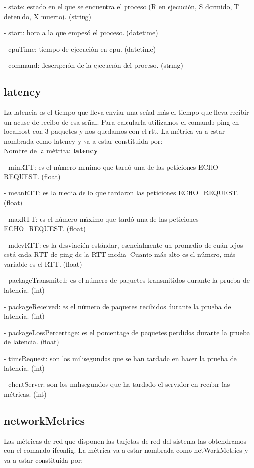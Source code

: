 \documentclass[ spanish, a4paper, 12pt, oneside]{report}
\begin{document}
\hyp{} state: estado en el que se encuentra el proceso (R en ejecución, S dormido, T detenido, X muerto). (string)

\hyp{} start: hora a la que empezó el proceso. (datetime)
  
\hyp{} cpuTime: tiempo de ejecución en cpu. (datetime)
  
\hyp{} command: descripción de la ejecución del proceso. (string)


\subsection{latency}
La latencia es el tiempo que lleva enviar una señal más el tiempo que lleva recibir un acuse de recibo de esa señal.
Para calcularla utilizamos el comando ping en localhost con 3 paquetes y nos quedamos con el rtt. 
La métrica va a estar nombrada como latency y va a estar constituida por:\\
  
Nombre de la métrica: \textbf{latency}

\hyp{} minRTT: es el número mínimo que tardó una  de las peticiones ECHO\_ REQUEST. (float)

\hyp{} meanRTT: es la media de lo que tardaron las peticiones ECHO\_REQUEST. (float)

\hyp{} maxRTT: es el número máximo que tardó una de las peticiones ECHO\_REQUEST. (float)

\hyp{} mdevRTT: es la desviación estándar, esencialmente un promedio de cuán lejos está cada RTT de ping de la RTT media. 
Cuanto más alto es el número, más variable es el RTT. (float)

\hyp{} packageTransmited: es el número de paquetes transmitidos durante la prueba de latencia. (int)

\hyp{} packageReceived: es el número de paquetes recibidos durante la prueba de latencia. (int)

\hyp{} packageLossPercentage: es el porcentage de paquetes perdidos durante la prueba de latencia. (float)

\hyp{} timeRequest: son los milisegundos que se han tardado en hacer la prueba de latencia. (int)

\hyp{} clientServer: son los milisegundos que ha tardado el servidor en recibir las métricas. (int) 

\subsection{networkMetrics}
Las métricas de red que disponen las tarjetas de red del sistema las obtendremos con el comando ifconfig.
La métrica va a estar nombrada como netWorkMetrics y va a estar constituida por:\\
  
\end{document}
